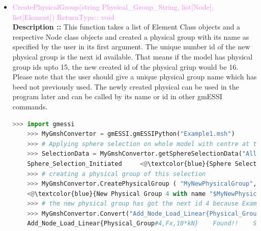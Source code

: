 \documentclass[11pt]{article}
\begin{document}
\begin{itemize}
    \item \textcolor{violet}{ CreatePhysicalGroup(string Physical\_Group\_String, list[Node], list[Element]) \hfill {ReturnType:: void}} \\
    \textbf{Description ::} This function takes a list of Element Class objects and a respective Node class objects and created a physical group with its name as specified by the user in its first argument. The unique number id of the new physical group is the next id available. That means if the model has physical group ids upto 15, the new created id of the physical griup would be 16. Please note that the user should give a unique physical group name which has beed not previously used. The newly created physical can be used in the program later and can be called by its name or id in other gmESSI commands. 
    \begin{lstlisting}[language=Python]
    >>> import gmessi
    >>> MyGmshConvertor = gmESSI.gmESSIPython("Example1.msh")
    >>> # Applying sphere selection on whole model with centre at the cente of the model (2,0.5,0.5) and radius as 2 units
    >>> SelectionData = MyGmshConvertor.getSphereSelectionData("All",2,2,0.5,0.5)
    Sphere_Selection_Initiated     <@\textcolor{blue}{Sphere Selection Made over All Model with radius 2 and center at 2 0.5 0.5}@>
    >>> # creating a physical group of this selection
    >>> MyGmshConvertor.CreatePhysicalGroup ( "MyNewPhysicalGroup", SelectionData.NodeList, SelectionData.ElementList)
    <@\textcolor{blue}{New Physical Group 4 with name "$MyNewPhysicalGroup$" created}@>
    >>> # the new physical group has got the next id 4 because Example1.msh had the last physical group with id 3. The user can use the new created physical group.
    >>> MyGmshConvertor.Convert("Add_Node_Load_Linear{Physical_Group#4,Fx,10*kN}")
    Add_Node_Load_Linear{Physical_Group#4,Fx,10*kN}    Found!!    Sucessfully Converted

    \end{lstlisting}


\end{itemize}
\end{document}
